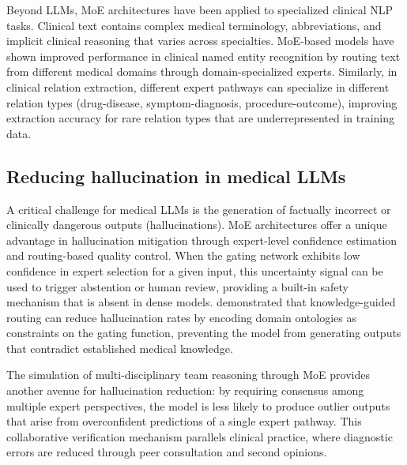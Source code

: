 Beyond LLMs, MoE architectures have been applied to specialized clinical NLP tasks. Clinical text contains complex medical terminology, abbreviations, and implicit clinical reasoning that varies across specialties. MoE-based models have shown improved performance in clinical named entity recognition by routing text from different medical domains through domain-specialized experts. Similarly, in clinical relation extraction, different expert pathways can specialize in different relation types (drug-disease, symptom-diagnosis, procedure-outcome), improving extraction accuracy for rare relation types that are underrepresented in training data.

\subsection*{Reducing hallucination in medical LLMs}

A critical challenge for medical LLMs is the generation of factually incorrect or clinically dangerous outputs (hallucinations). MoE architectures offer a unique advantage in hallucination mitigation through expert-level confidence estimation and routing-based quality control. When the gating network exhibits low confidence in expert selection for a given input, this uncertainty signal can be used to trigger abstention or human review, providing a built-in safety mechanism that is absent in dense models. \cite{bechar2025biocancer_moe} demonstrated that knowledge-guided routing can reduce hallucination rates by encoding domain ontologies as constraints on the gating function, preventing the model from generating outputs that contradict established medical knowledge.

The simulation of multi-disciplinary team reasoning through MoE \cite{chen2026cor_mole} provides another avenue for hallucination reduction: by requiring consensus among multiple expert perspectives, the model is less likely to produce outlier outputs that arise from overconfident predictions of a single expert pathway. This collaborative verification mechanism parallels clinical practice, where diagnostic errors are reduced through peer consultation and second opinions.
